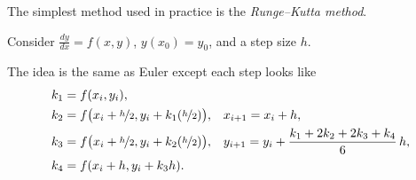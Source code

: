 \documentclass[10pt,aspectratio=169]{beamer}
\begin{document}
\begin{frame}

The simplest method used in practice is the
\emph{Runge--Kutta method}.

Consider $\frac{dy}{dx}=f(x,y)$, $y(x_0) = y_0$, and a step size $h$.

\medskip
\pause

The idea is the same as Euler except each step looks like
\begin{align*}
& k_1 = f(x_i,y_i) , & & \\
& k_2 = f\bigl(x_i + \nicefrac{h}{2},y_i + k_1 (\nicefrac{h}{2})\bigr) ,
& & 
x_{i+1} = x_i + h , \\
& k_3 = f\bigl(x_i + \nicefrac{h}{2},y_i + k_2 (\nicefrac{h}{2})\bigr) ,
& &
y_{i+1} = y_i + \frac{k_1 + 2k_2 + 2k_3 + k_4}{6}\,h ,  \\
& k_4 = f(x_i + h,y_i + k_3 h) .
\end{align*}

\end{frame}
\end{document}
